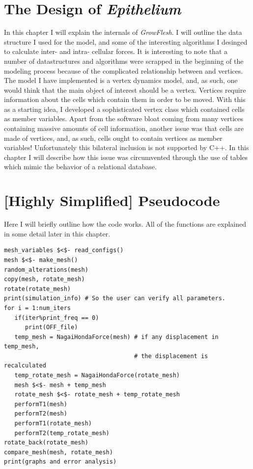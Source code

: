 \section{The Design of \emph{Epithelium}}
In this chapter I will explain the internals of \emph{GrowFlesh}. I will outline the data structure I used for the model, and some of the interesting algorithms I desinged to calculate inter- and intra- cellular forces. It is interesting to note that a number of datastructures and algorithms were scrapped in the beginning of the modeling process because of the complicated relationship between and vertices. The model I have implemented is a vertex dynamics model, and, as such, one would think that the main object of interest should be a vertex. Vertices require information about the cells which contain them in order to be moved. With this as a starting idea, I developed a sophisticated vertex class which contained cells as member variables. Apart from the software bloat coming from many vertices containing massive amounts of cell information, another issue was that cells are made of vertices, and, as such, cells ought to contain vertices as member variables! Unfortunately this bilateral inclusion is not supported by C++. In this chapter I will describe how this issue was circumvented through the use of tables which mimic the behavior of a relational database.

\section{[Highly Simplified] Pseudocode}
Here I will briefly outline how the code works. All of the functions are explained in some detail later in this chapter.
\begin{lstlisting}
mesh_variables $<$- read_configs()
mesh $<$- make_mesh()
random_alterations(mesh)
copy(mesh, rotate_mesh)
rotate(rotate_mesh)
print(simulation_info) # So the user can verify all parameters.
for i = 1:num_iters
   if(iter%print_freq == 0)
      print(OFF_file)
   temp_mesh = NagaiHondaForce(mesh) # if any displacement in temp_mesh,
                                     # the displacement is recalculated
   temp_rotate_mesh = NagaiHondaForce(rotate_mesh)
   mesh $<$- mesh + temp_mesh
   rotate_mesh $<$- rotate_mesh + temp_rotate_mesh
   performT1(mesh)
   performT2(mesh)
   performT1(rotate_mesh)
   performT2(temp_rotate_mesh)
rotate_back(rotate_mesh)
compare_mesh(mesh, rotate_mesh)
print(graphs and error analysis)
\end{lstlisting}

